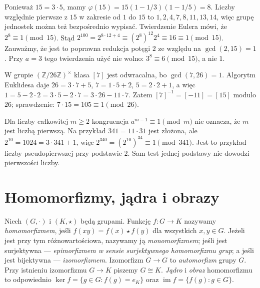 \begin{przyklad}
\label{aa:prz:euler15}
Ponieważ $15=3\cdot5$, mamy
$\varphi(15)=15(1-1/3)(1-1/5)=8$.
Liczby względnie pierwsze z $15$ w zakresie od $1$ do $15$
to $1,2,4,7,8,11,13,14$, więc grupę jednostek można też
bezpośrednio wypisać. Twierdzenie Eulera mówi, że
$2^8\equiv1\pmod{15}$. Stąd
$2^{100}=2^{8\cdot12+4}\equiv(2^8)^{12}2^4
\equiv16\equiv1\pmod{15}$.
Zauważmy, że jest to poprawna redukcja potęgi $2$
ze względu na $\gcd(2,15)=1$.
Przy $a=3$ tego twierdzenia użyć nie wolno:
$3^8\equiv6\pmod{15}$, a nie $1$.
\end{przyklad}

\begin{przyklad}
W grupie $(\mathbb Z/26\mathbb Z)^\times$ klasa $[7]$
jest odwracalna, bo $\gcd(7,26)=1$.
Algorytm Euklidesa daje $26=3\cdot7+5$,
$7=1\cdot5+2$, $5=2\cdot2+1$, a więc
$1=5-2\cdot2=3\cdot5-2\cdot7=3\cdot26-11\cdot7$.
Zatem $[7]^{-1}=[-11]=[15]$ modulo $26$;
sprawdzenie: $7\cdot15=105\equiv1\pmod{26}$.
\end{przyklad}

\begin{uwaga}
Dla liczby całkowitej $m\ge2$ kongruencja
$a^{m-1}\equiv1\pmod m$ nie oznacza, że $m$ jest liczbą pierwszą.
Na przykład $341=11\cdot31$
jest złożona, ale $2^{10}=1024=3\cdot341+1$,
więc $2^{340}=(2^{10})^{34}\equiv1\pmod{341}$.
Jest to przykład liczby pseudopierwszej przy podstawie $2$.
Sam test jednej podstawy nie dowodzi pierwszości liczby.
\end{uwaga}

\section{Homomorfizmy, jądra i obrazy}
\begin{definicja}
\label{aa:def:hom}
Niech $(G,\cdot)$ i $(K,\star)$ będą grupami.
Funkcję $f:G\to K$ nazywamy \emph{homomorfizmem}, jeśli
$f(xy)=f(x)\star f(y)$ dla wszystkich $x,y\in G$.
Jeżeli jest przy tym różnowartościowa, nazywamy ją
\emph{monomorfizmem}; jeśli jest surjektywna ---
\emph{epimorfizmem w sensie surjektywnego homomorfizmu grup};
a jeśli jest bijektywna --- \emph{izomorfizmem}.
Izomorfizm $G\to G$ to \emph{automorfizm} grupy $G$.
Przy istnieniu izomorfizmu $G\to K$ piszemy $G\cong K$.
\emph{Jądro} i \emph{obraz} homomorfizmu to odpowiednio
$\ker f=\{g\in G:f(g)=e_K\}$ oraz
$\operatorname{im}f=\{f(g):g\in G\}$.
\end{definicja}

